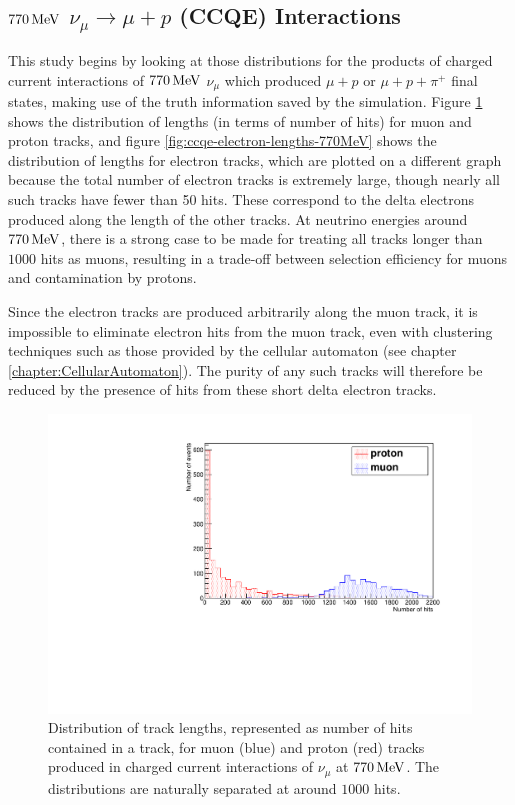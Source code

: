 \subsection{$770\MeV$ $\nu_\mu \rightarrow \mu + p$ (CCQE) Interactions}
This study begins by looking at those distributions for the products of charged current interactions of $770\MeV$ $\nu_\mu$ which produced $\mu + p$ or $\mu + p + \pi^+$ final states, making use of the truth information saved by the simulation. Figure \ref{fig:ccqe-track-lengths-770MeV} shows the distribution of lengths (in terms of number of hits) for muon and proton tracks, and figure \ref{fig:ccqe-electron-lengths-770MeV} shows the distribution of lengths for electron tracks, which are plotted on a different graph because the total number of electron tracks is extremely large, though nearly all such tracks have fewer than 50 hits. These correspond to the delta electrons produced along the length of the other tracks. At neutrino energies around $770\MeV$, there is a strong case to be made for treating all tracks longer than $1000$ hits as muons, resulting in a trade-off between selection efficiency for muons and contamination by protons.

Since the electron tracks are produced arbitrarily along the muon track, it is impossible to eliminate electron hits from the muon track, even with clustering techniques such as those provided by the cellular automaton (see chapter \ref{chapter:CellularAutomaton}). The purity of any such tracks will therefore be reduced by the presence of hits from these short delta electron tracks.

\begin{figure}
\centering
\includegraphics[angle=-90,width=\textwidth]{chapters/particleid_images/particle-lengths-ccqe-770}
\caption[Track length distribution for $\mu$ and $p$ from $770\MeV$ neutrinos (CCQE)]{\label{fig:ccqe-track-lengths-770MeV}Distribution of track lengths, represented as number of hits contained in a track, for muon (blue) and proton (red) tracks produced in charged current interactions of $\nu_\mu$ at $770\MeV$. The distributions are naturally separated at around $1000$ hits.}
\end{figure}

